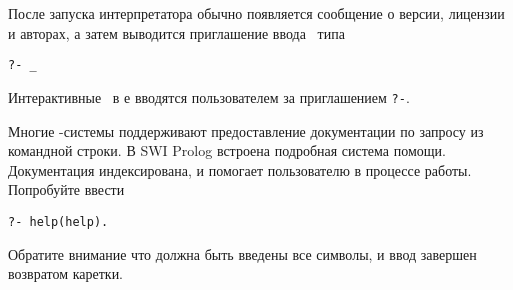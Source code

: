 После запуска интерпретатора обычно появляется сообщение о версии, лицензии и
авторах, а затем выводится приглашение ввода \ типа

\begin{verbatim}
?- _
\end{verbatim}

Интерактивные \ в \prolog е вводятся пользователем за приглашением
\verb|?-|.

Многие \prolog-системы поддерживают предоставление документации по запросу из
командной строки. В SWI Prolog встроена подробная система помощи. Документация
индексирована, и помогает пользователю в процессе работы. Попробуйте ввести

\begin{verbatim}
?- help(help).
\end{verbatim}

Обратите внимание что должна быть введены все символы, и ввод завершен возвратом
каретки.

